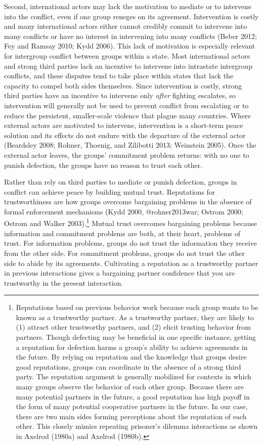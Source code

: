 \documentclass[11pt]{article}
\begin{document}
Second, international actors may lack the motivation to mediate or to
intervene into the conflict, even if one group reneges on its agreement.
Intervention is costly and many international actors either cannot
credibly commit to intervene into many conflicts or have no interest in
intervening into many conflicts (Beber 2012; Fey and Ramsay 2010; Kydd
2006). This lack of motivation is especially relevant for intergroup
conflict between groups within a state. Most international actors and
strong third parties lack an incentive to intervene into intrastate
intergroup conflicts, and these disputes tend to take place within
states that lack the capacity to compel both sides themselves. Since
intervention is costly, strong third parties have an incentive to
intervene only \emph{after} fighting escalates, so intervention will
generally not be used to prevent conflict from escalating or to reduce
the persistent, smaller-scale violence that plague many countries. Where
external actors are motivated to intervene, intervention is a short-term
peace solution and its effects do not endure with the departure of the
external actor (Beardsley 2008; Rohner, Thoenig, and Zilibotti 2013;
Weinstein 2005). Once the external actor leaves, the groups' commitment
problem returns: with no one to punish defection, the groups have no
reason to trust each other.

Rather than rely on third parties to mediate or punish defection, groups
in conflict can achieve peace by building mutual trust. Reputations for
trustworthiness are how groups overcome bargaining problems in the
absence of formal enforcement mechanisms (Kydd 2000, @rohner2013war;
Ostrom 2000; Ostrom and Walker 2003).\footnote{Reputations based on
  previous behavior work because each group wants to be known as a
  trustworthy partner. As a trustworthy partner, they are likely to (1)
  attract other trustworthy partners, and (2) elicit trusting behavior
  from partners. Though defecting may be beneficial in one specific
  instance, getting a reputation for defection harms a group's ability
  to achieve agreements in the future. By relying on reputation and the
  knowledge that groups desire good reputations, groups can coordinate
  in the absence of a strong third party. The reputation argument is
  generally mobilized for contexts in which many groups observe the
  behavior of each other group. Because there are many potential
  partners in the future, a good reputation has high payoff in the form
  of many potential cooperative partners in the future. In our case,
  there are two main sides forming perceptions about the reputation of
  each other. This closely mimics repeating prisoner's dilemma
  interactions as shown in Axelrod (1980a) and Axelrod (1980b).} Mutual
trust overcomes bargaining problems because information and commitment
problems are both, at their heart, problems of trust. For information
problems, groups do not trust the information they receive from the
other side. For commitment problems, groups do not trust the other side
to abide by its agreements. Cultivating a reputation as a trustworthy
partner in previous interactions gives a bargaining partner confidence
that you are trustworthy in the present interaction.
\end{document}
